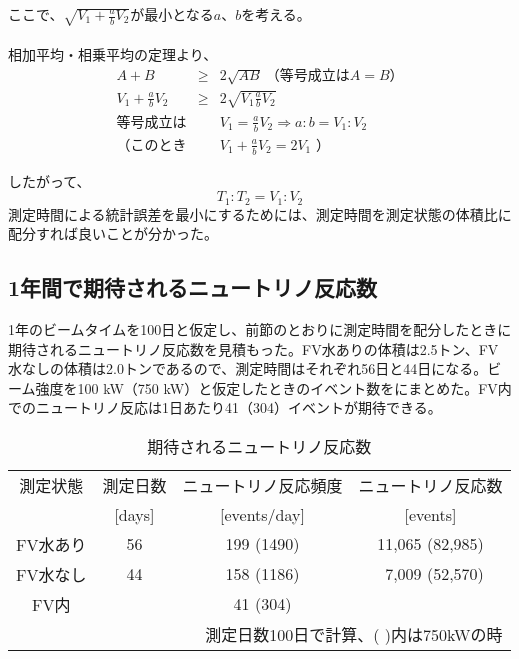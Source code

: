 ここで、$\sqrt{V_{1}+\frac{a}{b}V_{2}}$が最小となる$a$、$b$を考える。
\\
\\
相加平均・相乗平均の定理より、
\begin{eqnarray}
A + B & \ge & 2\sqrt{AB} \ \text{（等号成立は$A=B$）} \label{sksj}\\
V_{1} + \frac{a}{b}V_{2} & \ge & 2\sqrt{V_{1}\frac{a}{b}V_{2}}\\
\text{等号成立は} & & V_{1} = \frac{a}{b}V_{2} \Rightarrow a:b=V_{1}:V_{2}\\
\text{（このとき} & & V_{1}+\frac{a}{b}V_{2} = 2V_{1}\text{\ ）}
\end{eqnarray}

したがって、
\begin{equation}
T_{1}:T_{2} = V_{1}:V_{2}
\end{equation}
測定時間による統計誤差を最小にするためには、測定時間を測定状態の体積比に配分すれば良いことが分かった。

\subsection{1年間で期待されるニュートリノ反応数}
1年のビームタイムを100日と仮定し、前節のとおりに測定時間を配分したときに期待されるニュートリノ反応数を見積もった。FV水ありの体積は2.5トン、FV水なしの体積は2.0トンであるので、測定時間はそれぞれ56日と44日になる。ビーム強度を100 kW（750 kW）と仮定したときのイベント数をにまとめた。FV内でのニュートリノ反応は1日あたり41（304）イベントが期待できる。


\begin{table}[htbp]
\caption[期待されるニュートリノ反応数]{期待されるニュートリノ反応数}
\begin{center}
\begin{tabular}{cccc}
\hline \hline
測定状態 & 測定日数 & ニュートリノ反応頻度 & ニュートリノ反応数\\
& [days] & [events/day] & [events]\\
\hline
FV水あり & 56 & 199 (1490) & 11,065 (82,985)\\
FV水なし & 44 & 158 (1186) &\ 7,009 (52,570)\\
\hline
FV内 & & 41 (304) &\\
\hline \hline
\multicolumn{4}{r}{測定日数100日で計算、( )内は750kWの時}\\
\end{tabular}
\end{center}
\label{EventEstimationYear}
\end{table}%

